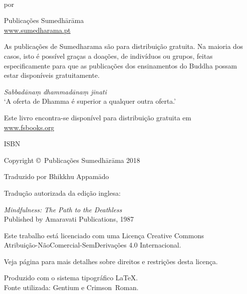 \cleartoverso
\thispagestyle{empty}

{\copyrightsize
\centering
\setlength{\parindent}{0pt}%
\setlength{\parskip}{0.8\baselineskip}%

\thetitle\\
por \theauthor

Publicações Sumedhārāma\\
\href{http://sumedharama.pt}{www.sumedharama.pt}

As publicações de Sumedharama são para distribuição gratuita. Na maioria
dos casos, isto é possível graças a doações, de indivíduos ou grupos,
feitas especificamente para que as publicações dos ensinamentos do
Buddha possam estar disponíveis gratuitamente.

\textit{Sabbadānaṃ dhammadānaṃ jinati}\\
`A oferta de Dhamma é superior a qualquer outra oferta.'

Este livro encontra-se disponível para distribuição gratuita em\\
\href{http://fsbooks.org/}{www.fsbooks.org}

ISBN \theISBN

Copyright \copyright\ Publicações Sumedhārāma 2018

Traduzido por Bhikkhu Appamādo

Tradução autorizada da edição inglesa:

\emph{Mindfulness: The Path to the Deathless}\\
Published by Amaravati Publications, 1987

\vfill

{\footnotesize

Este trabalho está licenciado com uma Licença Creative Commons\\
Atribuição-NãoComercial-SemDerivações 4.0 Internacional.

Veja página \pageref{copyright-details} para mais detalhes sobre direitos e restrições desta licença.

Produzido com o sistema tipográfico \LaTeX.\\
Fonte utilizada: Gentium e Crimson~Roman.

\theEditionInfo

}}
